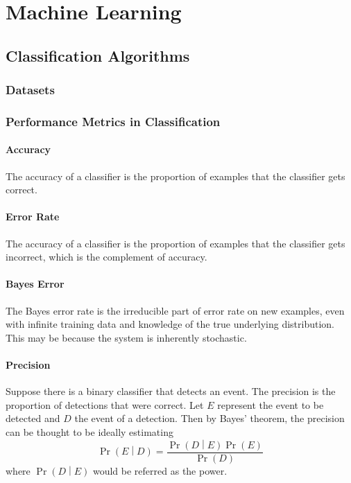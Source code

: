 \documentclass[11pt]{report} %
\begin{document}
\chapter{Machine Learning}

\section{Classification Algorithms}

\subsection{Datasets}

\subsection{Performance Metrics in Classification \cite{Goodfellow2016}}

\subsubsection{Accuracy}

The accuracy of a classifier is the proportion of examples that the classifier gets correct.

\subsubsection{Error Rate}

The accuracy of a classifier is the proportion of examples that the classifier gets incorrect, which is the complement of accuracy.

\subsubsection{Bayes Error}

The Bayes error rate is the irreducible part of error rate on new examples, even with infinite training data and knowledge of the true underlying distribution. This may be because the system is inherently stochastic.

\subsubsection{Precision}

Suppose there is a binary classifier that detects an event. The precision is the proportion of detections that were correct. Let $E$ represent the event to be detected and $D$ the event of a detection. Then by Bayes' theorem, the precision can be thought to be ideally estimating
\begin{equation}
\operatorname{Pr}\left(E\middle|D\right) = \dfrac{\operatorname{Pr}\left(D\middle|E\right)\operatorname{Pr}\left(E\right)}{\operatorname{Pr}\left(D\right)}
\end{equation}
where $\operatorname{Pr}\left(D\middle|E\right)$ would be referred as the power.
\end{document}
